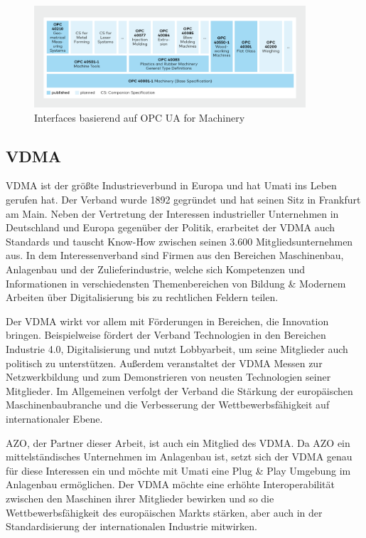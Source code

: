 \documentclass[a4paper, 12pt, oneside]{scrbook}
\begin{document}
		\begin{figure}[H]
			\centering
			\includegraphics[width=0.9\textwidth]{res/diagramms/OPCUA_for_machinery.png}
			\caption{Interfaces basierend auf OPC UA for Machinery \cite{noauthor_machinery_nodate}} 
			\label{fig:OPCUA_for_machinery}
		\end{figure}
		
		
		\subsection{VDMA}
		
		\ac{VDMA} ist der größte Industrieverbund in Europa und hat Umati ins Leben gerufen hat. Der Verband wurde 1892 gegründet und hat seinen Sitz in Frankfurt am Main. Neben der Vertretung der Interessen industrieller Unternehmen in Deutschland und Europa gegenüber der Politik, erarbeitet der VDMA auch Standards und tauscht Know-How zwischen seinen 3.600 Mitgliedsunternehmen aus. \cite{noauthor_verband_nodate} In dem Interessenverband sind Firmen aus den Bereichen Maschinenbau, Anlagenbau und der Zulieferindustrie, welche sich Kompetenzen und Informationen in verschiedensten Themenbereichen von Bildung \& Modernem Arbeiten über Digitalisierung bis zu rechtlichen Feldern teilen. \cite{noauthor_themenubersicht_nodate}
		
		Der VDMA wirkt vor allem mit Förderungen in Bereichen, die Innovation bringen. Beispielweise fördert der Verband Technologien in den Bereichen Industrie 4.0, Digitalisierung und nutzt Lobbyarbeit, um seine Mitglieder auch politisch zu unterstützen. Außerdem veranstaltet der VDMA Messen zur Netzwerkbildung und zum Demonstrieren von neusten Technologien seiner Mitglieder. Im Allgemeinen verfolgt der Verband die Stärkung der europäischen Maschinenbaubranche und die Verbesserung der Wettbewerbsfähigkeit auf internationaler Ebene. \cite{noauthor_themenubersicht_nodate}
		
		AZO, der Partner dieser Arbeit, ist auch ein Mitglied des VDMA. Da AZO ein mittelständisches Unternehmen im Anlagenbau ist, setzt sich der VDMA genau für diese Interessen ein und möchte mit Umati eine Plug \& Play Umgebung im Anlagenbau ermöglichen. Der VDMA möchte eine erhöhte Interoperabilität zwischen den Maschinen ihrer Mitglieder bewirken und so die Wettbewerbsfähigkeit des europäischen Markts stärken, aber auch in der Standardisierung der internationalen Industrie mitwirken. 
		
\end{document}
